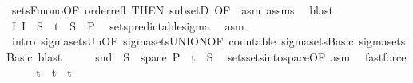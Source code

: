 \begin{isabellebody}
\ sets{\isacharunderscore}{\kern0pt}F{\isacharunderscore}{\kern0pt}mono{\isacharbrackleft}{\kern0pt}OF\ order{\isacharunderscore}{\kern0pt}refl{\isacharcomma}{\kern0pt}\ THEN\ subsetD{\isacharcomma}{\kern0pt}\ OF\ {\isacharunderscore}{\kern0pt}\ asm{\isacharbrackright}{\kern0pt}\ assms{\isacharparenleft}{\kern0pt}{}{\isacharparenright}{\kern0pt}\ \isamarkupfalse%
\ blast\isanewline
\ \ \isamarkupfalse%
\ {\isachardoublequoteopen}{\isacharparenleft}{\kern0pt}{\isasymUnion}I{\isasymin}{\isasymI}{\isachardot}{\kern0pt}\ I\ {\isasymtimes}\ S{\isacharparenright}{\kern0pt}\ {\isasymunion}\ {\isacharbraceleft}{\kern0pt}t\ {\isasymtimes}\ S\ {\isasymin}\ {\isasymSigma}\isactrlsub P{\isachardoublequoteclose}\ \isamarkupfalse%
\ sets{\isacharunderscore}{\kern0pt}predictable{\isacharunderscore}{\kern0pt}sigma\ \isamarkupfalse%
\ asm\ \isamarkupfalse%
\ {\isacharparenleft}{\kern0pt}intro\ sigma{\isacharunderscore}{\kern0pt}sets{\isacharunderscore}{\kern0pt}Un{\isacharbrackleft}{\kern0pt}OF\ sigma{\isacharunderscore}{\kern0pt}sets{\isacharunderscore}{\kern0pt}UNION{\isacharbrackleft}{\kern0pt}OF\ countable{\isacharbrackright}{\kern0pt}\ sigma{\isacharunderscore}{\kern0pt}sets{\isachardot}{\kern0pt}Basic{\isacharbrackright}{\kern0pt}\ sigma{\isacharunderscore}{\kern0pt}sets{\isachardot}{\kern0pt}Basic{\isacharparenright}{\kern0pt}\ blast{\isacharplus}{\kern0pt}\isanewline
\ \ \isamarkupfalse%
\ \isamarkupfalse%
\ {\isachardoublequoteopen}snd\ {\isacharminus}{\kern0pt}{\isacharbackquote}{\kern0pt}\ S\ {\isasyminter}\ space\ {\isasymSigma}\isactrlsub P\ {\isacharequal}{\kern0pt}\ {\isacharbraceleft}{\kern0pt}t\ {\isasymtimes}\ S{\isachardoublequoteclose}\ \isamarkupfalse%
\ sets{\isachardot}{\kern0pt}sets{\isacharunderscore}{\kern0pt}into{\isacharunderscore}{\kern0pt}space{\isacharbrackleft}{\kern0pt}OF\ asm{\isacharbrackright}{\kern0pt}\ \isamarkupfalse%
\ fastforce\isanewline
\ \ \isamarkupfalse%
\ \isamarkupfalse%
\ {\isachardoublequoteopen}{\isacharbraceleft}{\kern0pt}t\ {\isasymunion}\ {\isacharbraceleft}{\kern0pt}t\ {\isacharequal}{\kern0pt}\ {\isacharbraceleft}{\kern0pt}t\ \isamarkupfalse%

\end{isabellebody}
